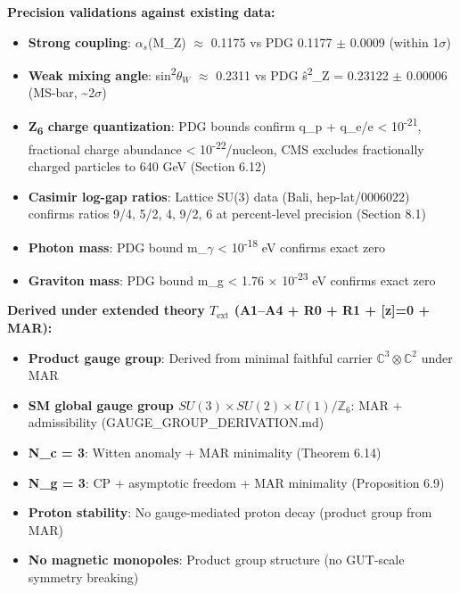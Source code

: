 \documentclass[11pt,a4paper]{article}
\theoremstyle{remark}
\providecommand{\tightlist}{%
  \setlength{\itemsep}{0pt}\setlength{\parskip}{0pt}}
\begin{document}
\textbf{Precision validations against existing data:}

\begin{itemize}
\tightlist
\item
  \textbf{Strong coupling}: $\alpha_s$(M\_Z) \ensuremath{\approx} 0.1175 vs PDG 0.1177 \ensuremath{\pm} 0.0009 (within 1\ensuremath{\sigma})
\item
  \textbf{Weak mixing angle}: sin\textsuperscript{2}$\theta_W$ \ensuremath{\approx} 0.2311 vs PDG \^{s}\textsuperscript{2}\_Z = 0.23122 \ensuremath{\pm} 0.00006 (MS-bar, \textasciitilde2\ensuremath{\sigma})
\item
  \textbf{Z\textsubscript{6} charge quantization}: PDG bounds confirm \textbar q\_p + q\_e\textbar/e \textless{} 10\textsuperscript{-21}, fractional charge abundance \textless{} 10\textsuperscript{-22}/nucleon, CMS excludes fractionally charged particles to 640 GeV (Section 6.12)
\item
  \textbf{Casimir log-gap ratios}: Lattice SU(3) data (Bali, hep-lat/0006022) confirms ratios 9/4, 5/2, 4, 9/2, 6 at percent-level precision (Section 8.1)
\item
  \textbf{Photon mass}: PDG bound m\_\ensuremath{\gamma} \textless{} 10\textsuperscript{-18} eV confirms exact zero
\item
  \textbf{Graviton mass}: PDG bound m\_g \textless{} 1.76 \ensuremath{\times} 10\textsuperscript{-23} eV confirms exact zero
\end{itemize}

\textbf{Derived under extended theory \(T_{\mathrm{ext}}\) (A1--A4 + R0 + R1 + {[}z{]}=0 + MAR):}

\begin{itemize}
\tightlist
\item
  \textbf{Product gauge group}: Derived from minimal faithful carrier \(\mathbb{C}^3 \otimes \mathbb{C}^2\) under MAR
\item
  \textbf{SM global gauge group \(SU(3) \times SU(2) \times U(1)/\mathbb{Z}_6\)}: MAR + admissibility (GAUGE\_GROUP\_DERIVATION.md)
\item
  \textbf{N\_c = 3}: Witten anomaly + MAR minimality (Theorem 6.14)
\item
  \textbf{N\_g = 3}: CP + asymptotic freedom + MAR minimality (Proposition 6.9)
\item
  \textbf{Proton stability}: No gauge-mediated proton decay (product group from MAR)
\item
  \textbf{No magnetic monopoles}: Product group structure (no GUT-scale symmetry breaking)
\end{itemize}
\end{document}
